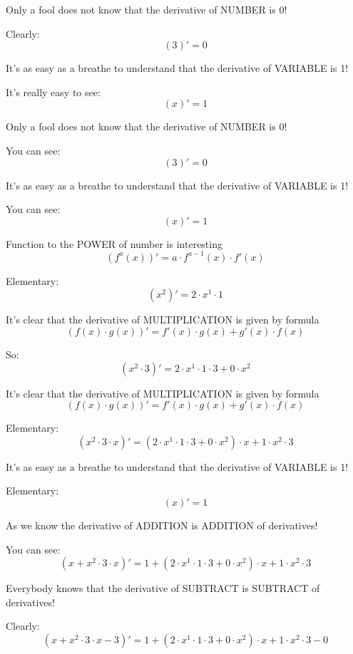 \documentclass[a4paper,12pt]{article}
\begin{document}
Only a fool does not know that the derivative of NUMBER is 0!

Clearly:
\[ \left(3\right)' = 0 \]

It's as easy as a breathe to understand that the derivative of VARIABLE is 1!

It's really easy to see:
\[ \left(x\right)' = 1 \]

Only a fool does not know that the derivative of NUMBER is 0!

You can see:
\[ \left(3\right)' = 0 \]

It's as easy as a breathe to understand that the derivative of VARIABLE is 1!

You can see:
\[ \left(x\right)' = 1 \]

Function to the POWER of number is interesting                                        \[\left(f^a(x)\right)' = a \cdot f^{a - 1}(x) \cdot f'(x)\]

Elementary:
\[ \left(x ^ { 2 }\right)' = 2 \cdot x ^ { 1 } \cdot 1 \]

It's clear that the derivative of MULTIPLICATION is given by formula                                \[(f(x) \cdot g(x))' = f'(x) \cdot g(x) + g'(x) \cdot f(x)\]

So:
\[ \left(x ^ { 2 } \cdot 3\right)' = 2 \cdot x ^ { 1 } \cdot 1 \cdot 3 + 0 \cdot x ^ { 2 } \]

It's clear that the derivative of MULTIPLICATION is given by formula                                \[(f(x) \cdot g(x))' = f'(x) \cdot g(x) + g'(x) \cdot f(x)\]

Elementary:
\[ \left(x ^ { 2 } \cdot 3 \cdot x\right)' = \left( 2 \cdot x ^ { 1 } \cdot 1 \cdot 3 + 0 \cdot x ^ { 2 }\right)  \cdot x + 1 \cdot x ^ { 2 } \cdot 3 \]

It's as easy as a breathe to understand that the derivative of VARIABLE is 1!

Elementary:
\[ \left(x\right)' = 1 \]

As we know the derivative of ADDITION is ADDITION of derivatives!

You can see:
\[ \left(x + x ^ { 2 } \cdot 3 \cdot x\right)' = 1 + \left( 2 \cdot x ^ { 1 } \cdot 1 \cdot 3 + 0 \cdot x ^ { 2 }\right)  \cdot x + 1 \cdot x ^ { 2 } \cdot 3 \]

Everybody knows that the derivative of SUBTRACT is SUBTRACT of derivatives!

Clearly:
\[ \left(x + x ^ { 2 } \cdot 3 \cdot x - 3\right)' = 1 + \left( 2 \cdot x ^ { 1 } \cdot 1 \cdot 3 + 0 \cdot x ^ { 2 }\right)  \cdot x + 1 \cdot x ^ { 2 } \cdot 3 - 0 \]
\end{document}

